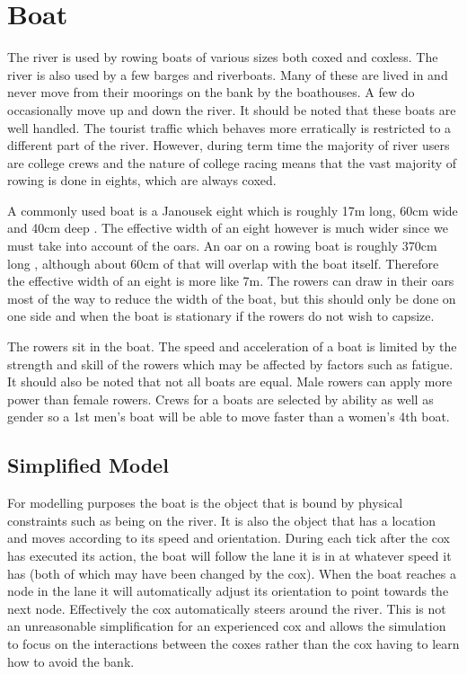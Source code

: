     \section{Boat}
      The river is used by rowing boats
      of various sizes both coxed and coxless. The river is also used by a few barges and riverboats. Many of these
      are lived in and never move from their moorings on the bank by the boathouses. A few do occasionally move
      up and down the river. It should be noted that these boats are well
      handled. The tourist traffic which behaves more erratically is
      restricted to a different part of the river. 
      However, during term time the majority of river users are college crews and the nature of
      college racing means that the vast majority of rowing is done in eights, which are always coxed. 
      
      A commonly used boat is a Janousek eight which is roughly 17m long, 60cm wide and 40cm deep
      \cite{Janousek}. The effective width of an eight however is much wider
      since we must take into account of the oars. An oar on a rowing boat
      is roughly 370cm long \cite{Concept2}, although about 60cm of that
      will overlap with the boat itself. Therefore the effective width of an
      eight is more like 7m. The rowers can draw in their oars most of the
      way to reduce the width of the boat, but this should only be done on
      one side and when the boat is stationary if the rowers do not wish to
      capsize.

      The rowers sit in the boat. The speed and acceleration of a boat
      is limited by the strength and skill of the rowers which may be affected by factors such as fatigue. It should also be noted that
      not all boats are equal. Male rowers can apply more power than female
      rowers. Crews for a boats are selected by ability as well as gender so a 1st men's boat will
      be able to move faster than a women's 4th boat.
      
      \subsection{Simplified Model}\label{model:boat:simplified}
      For modelling purposes the boat is the object that is bound by physical constraints such as being on the river. It is also the object that has a location and moves according to its speed and orientation. During each tick after the cox has executed its action, the boat will follow the lane it is in at whatever speed it has (both of which may have been changed by the cox). When the boat reaches a node in the lane it will automatically adjust its orientation to point towards the next node. Effectively the cox automatically steers around the river. This is not an unreasonable simplification for an experienced cox and allows the simulation to focus on the interactions between the coxes rather than the cox having to learn how to avoid the bank.
      
